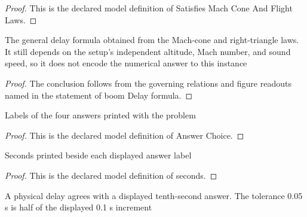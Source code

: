 \begin{proof}
  This is the declared model definition of Satisfies Mach Cone And Flight Laws.
\end{proof}
\begin{lemma}
  \label{lem:physics:phyx-mini-0198:phyxminiproblems-problemphyxmini0198-boomdelay-formula}
  The general delay formula obtained from the Mach-cone and right-triangle laws. It still depends on the setup's independent altitude, Mach number, and sound speed, so it does not encode the numerical answer to this instance
\end{lemma}
\begin{proof}
  The conclusion follows from the governing relations and figure readouts named in the statement of boom Delay formula.
\end{proof}
\begin{definition}
  \label{def:physics:phyx-mini-0198:phyxminiproblems-problemphyxmini0198-answerchoice}
  Labels of the four answers printed with the problem
\end{definition}
\begin{proof}
  This is the declared model definition of Answer Choice.
\end{proof}
\begin{definition}[seconds]
  \label{def:physics:phyx-mini-0198:phyxminiproblems-problemphyxmini0198-answerchoice-seconds}
  Seconds printed beside each displayed answer label
\end{definition}
\begin{proof}
  This is the declared model definition of seconds.
\end{proof}
\begin{definition}
  \label{def:physics:phyx-mini-0198:phyxminiproblems-problemphyxmini0198-matchesanswerchoice}
  A physical delay agrees with a displayed tenth-second answer. The tolerance 0.05 s is half of the displayed 0.1 s increment
\end{definition}
